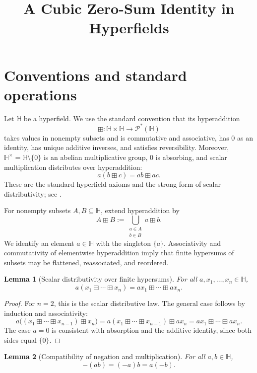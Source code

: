 \documentclass[11pt]{article}
\title{A Cubic Zero-Sum Identity in Hyperfields}
\author{}
\date{}
\newtheorem{lemma}{Lemma}
\newcommand{\hplus}{\boxplus}
\newcommand{\cP}{\mathcal P}
\begin{document}
\maketitle

\section{Conventions and standard operations}

Let \(\mathbb H\) be a hyperfield. We use the standard convention that its
hyperaddition
\[
\hplus\colon \mathbb H\times \mathbb H\longrightarrow \cP^{*}(\mathbb H)
\]
takes values in nonempty subsets and is commutative and associative, has \(0\)
as an identity, has unique additive inverses, and satisfies reversibility.
Moreover, \(\mathbb H^\times=\mathbb H\setminus\{0\}\) is an abelian
multiplicative group, \(0\) is absorbing, and scalar multiplication distributes
over hyperaddition:
\[
a(b\hplus c)=ab\hplus ac.
\]
These are the standard hyperfield axioms and the strong form of scalar
distributivity; see \cite{FactoringHyperfields,TropicalExtensions,Viro}.

For nonempty subsets \(A,B\subseteq\mathbb H\), extend hyperaddition by
\[
A\hplus B:=\bigcup_{\substack{a\in A\\ b\in B}}a\hplus b.
\]
We identify an element \(a\in\mathbb H\) with the singleton \(\{a\}\).
Associativity and commutativity of elementwise hyperaddition imply that finite
hypersums of subsets may be flattened, reassociated, and reordered.

\begin{lemma}[Scalar distributivity over finite hypersums]
\label{lem:scalar-distributivity}
For all \(a,x_1,\ldots,x_n\in\mathbb H\),
\[
a(x_1\hplus\cdots\hplus x_n)
=
ax_1\hplus\cdots\hplus ax_n.
\]
\end{lemma}

\begin{proof}
For \(n=2\), this is the scalar distributive law. The general case follows by
induction and associativity:
\[
a\bigl((x_1\hplus\cdots\hplus x_{n-1})\hplus x_n\bigr)
=
a(x_1\hplus\cdots\hplus x_{n-1})\hplus ax_n
=
ax_1\hplus\cdots\hplus ax_n.
\]
The case \(a=0\) is consistent with absorption and the additive identity, since
both sides equal \(\{0\}\).
\end{proof}

\begin{lemma}[Compatibility of negation and multiplication]
\label{lem:negation-multiplication}
For all \(a,b\in\mathbb H\),
\[
-(ab)=(-a)b=a(-b).
\]
\end{lemma}
\end{document}
